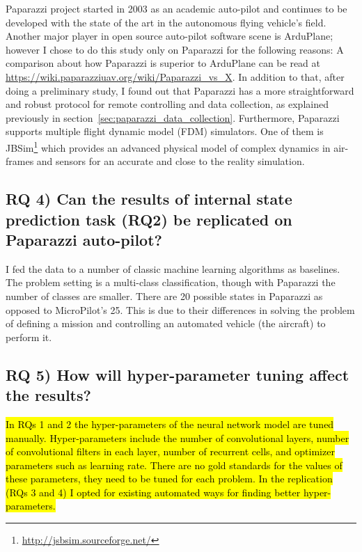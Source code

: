Paparazzi \cite{hattenberger2014using} project started in 2003 as an academic auto-pilot and continues to be developed with the state of the art in the autonomous flying vehicle's field. Another major player in open source auto-pilot software scene is ArduPlane; however I chose to do this study only on Paparazzi for the following reasons:
A comparison about how Paparazzi is superior to ArduPlane can be read at \url{https://wiki.paparazziuav.org/wiki/Paparazzi_vs_X}. 
In addition to that, after doing a preliminary study, I found out that Paparazzi has a more straightforward and robust protocol for remote controlling and data collection, as explained previously in section~\ref{sec:paparazzi_data_collection}. 
Furthermore, Paparazzi supports multiple flight dynamic model (FDM) simulators. One of them is JBSim\footnote{\url{http://jsbsim.sourceforge.net/}} which provides an advanced physical model of complex dynamics in air-frames and sensors for an accurate and close to the reality simulation. 



\subsection{RQ 4) Can the results of internal state prediction task (RQ2) be replicated on Paparazzi auto-pilot?}
I fed the data to a number of classic machine learning algorithms as baselines. The problem setting is a multi-class classification, though with Paparazzi the number of classes are smaller. 
There are 20 possible states in Paparazzi as opposed to MicroPilot's 25. This is due to their differences in solving the problem of defining a mission and controlling an automated vehicle (the aircraft) to perform it.

\subsection{RQ 5) How will hyper-parameter tuning affect the results?}
\hl{In RQs 1 and 2 the hyper-parameters of the neural network model are tuned manually. Hyper-parameters include the number of convolutional layers, number of convolutional filters in each layer, number of recurrent cells, and optimizer parameters such as learning rate. There are no gold standards for the values of these parameters, they need to be tuned for each problem. In the replication (RQs 3 and 4) I opted for existing automated ways for finding better hyper-parameters.}

